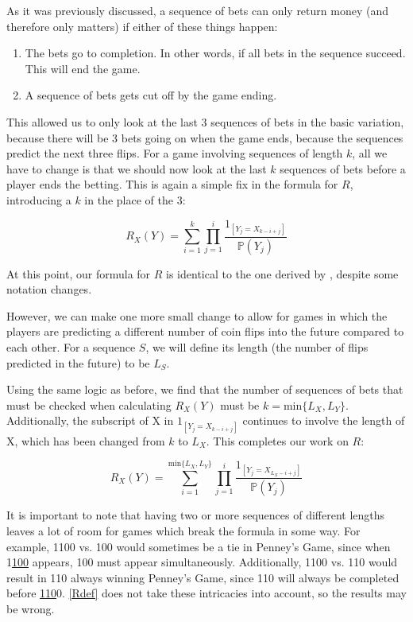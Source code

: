 \documentclass[english,12pt,a4paper,final]{article}
\begin{document}
As it was previously discussed, a sequence of bets can only return money (and therefore only matters) if either of these things happen:
\begin{enumerate}
	\item The bets go to completion. In other words, if all bets in the sequence succeed. This will end the game.
	\item A sequence of bets gets cut off by the game ending.
\end{enumerate}

This allowed us to only look at the last 3 sequences of bets in the basic variation, because there will be 3 bets going on when the game ends, because the sequences predict the next three flips. For a game involving sequences of length $k$, all we have to change is that we should now look at the last $k$ sequences of bets before a player ends the betting. This is again a simple fix in the formula for $R$, introducing a $k$ in the place of the 3:

\begin{equation}\label{RanyLength}
	R_X(Y) = \sum_{i=1}^{k} \prod_{j=1}^{i} \frac{1_{[Y_j = X_{k-i+j}]}}{\mathbb{P}(Y_j)}
\end{equation}

At this point, our formula for $R$ is identical to the one derived by \textcite{miller}, despite some notation changes.

However, we can make one more small change to allow for games in which the players are predicting a different number of coin flips into the future compared to each other. For a sequence $S$, we will define its length (the number of flips predicted in the future) to be $L_S$.

Using the same logic as before, we find that the number of sequences of bets that must be checked when calculating $R_X(Y)$ must be $k = \text{min}\{L_X, L_Y\}$. Additionally, the subscript of X in $1_{[Y_j = X_{k-i+j}]}$ continues to involve the length of X, which has been changed from $k$ to $L_X$. This completes our work on $R$:

\begin{equation}\label{Rdef}
	R_{X}(Y) = \sum_{i=1}^{\text{min}\{L_{X}, L_{Y}\}} \prod_{j=1}^{i} \frac{1_{[Y_{j} = X_{L_{X} - i + j}]}}{\mathbb{P}(Y_{j})}
\end{equation}

It is important to note that having two or more sequences of different lengths leaves a lot of room for games which break the formula in some way. For example, 1100 vs. 100 would sometimes be a tie in Penney's Game, since when 1\underline{100} appears, 100 must appear simultaneously. Additionally, 1100 vs. 110 would result in 110 always winning Penney's Game, since 110 will always be completed before \underline{110}0. \eqref{Rdef} does not take these intricacies into account, so the results may be wrong.
\end{document}
